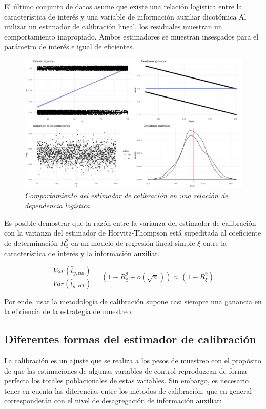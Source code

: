 \documentclass[
  12pt,
  spanish,
]{book}
\begin{document}
El último conjunto de datos asume que existe una relación logística entre la característica de interés y una variable de información auxiliar dicotómica Al utilizar un estimador de calibración lineal, los residuales muestran un comportamiento inapropiado. Ambos estimadores se muestran insesgados para el parámetro de interés e igual de eficientes.

\begin{figure}
\centering
\includegraphics{Pics/c8.png}
\caption{\emph{Comportamiento del estimador de calibración en una relación de dependencia logística}}
\end{figure}

Es posible demostrar que la razón entre la varianza del estimador de calibración con la varianza del estimador de Horvitz-Thompson está supeditada al coeficiente de determinación \(R^2_{\xi}\) en un modelo de regresión lineal simple \(\xi\) entre la característica de interés y la información auxiliar.

\[
\frac{Var(\hat t_{y, cal})}{Var(\hat t_{y, HT})} = (1-R^2_{\xi} + o(\sqrt{n})) \approx (1-R^2_{\xi})
\]

Por ende, usar la metodología de calibración supone casi siempre una ganancia en la eficiencia de la estrategia de muestreo.

\hypertarget{diferentes-formas-del-estimador-de-calibraciuxf3n}{%
\subsection{Diferentes formas del estimador de calibración}\label{diferentes-formas-del-estimador-de-calibraciuxf3n}}

La calibración es un ajuste que se realiza a los pesos de muestreo con el propósito de que las estimaciones de algunas variables de control reproduzcan de forma perfecta los totales poblacionales de estas variables. Sin embargo, es necesario tener en cuenta las diferencias entre los métodos de calibración, que en general corresponderán con el nivel de desagregación de información auxiliar:
\end{document}
